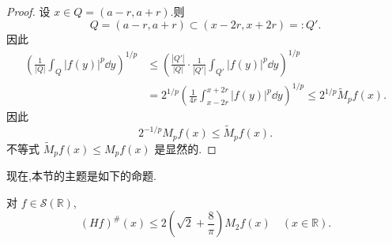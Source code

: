 \begin{proof}
设 $x \in Q = (a - r, a + r)$.则
\begin{equation*}
Q = (a - r, a + r) \subset (x - 2r, x + 2r) =: Q'.
\end{equation*}
因此
\begin{align*}
\left(\frac{1}{|Q|}\int_{Q}|f(y)|^{p}\dd y\right)^{1/p} &\leq \left(\frac{|Q'|}{|Q|}\cdot\frac{1}{|Q'|}\int_{Q'}|f(y)|^{p}\dd y\right)^{1/p} \\
&= 2^{1/p}\left(\frac{1}{4r}\int_{x-2r}^{x+2r}|f(y)|^{p}\dd y\right)^{1/p} \leq 2^{1/p}\tilde{M}_{p}f(x).
\end{align*}
因此
\begin{equation*}
2^{-1/p}M_{p}f(x) \leq \tilde{M}_{p}f(x).
\end{equation*}
不等式 $\tilde{M}_{p}f(x) \leq M_{p}f(x)$ 是显然的.
\end{proof}

现在,本节的主题是如下的命题.

\begin{proposition}\label{prop:1.4.5}
对 $f \in \mathcal{S}(\mathbb{R})$,
\begin{equation*}
(Hf)^{\#}(x) \leq 2\left(\sqrt{2} + \frac{8}{\pi}\right)M_{2}f(x) \quad (x \in \mathbb{R}).
\end{equation*}
\end{proposition}

